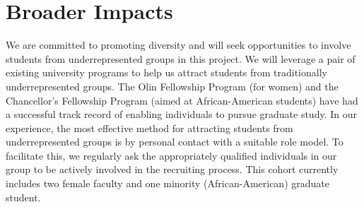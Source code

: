 \section{Broader Impacts}
\label{sec:broader}


We are committed to promoting diversity and will seek opportunities to
involve students from underrepresented groups in this project.
We will leverage a pair of existing university programs to help us
attract students from traditionally underrepresented groups.  The Olin
Fellowship Program (for women) and the Chancellor's Fellowship Program
(aimed at African-American students) have had a successful track
record of enabling individuals to pursue graduate study.  In our
experience, the most effective method for attracting students from
underrepresented groups is by personal contact with a suitable role
model.  To facilitate this, we regularly ask the appropriately
qualified individuals in our group to be actively involved in the
recruiting process.  This cohort currently includes two female
faculty and one minority (African-American)
graduate student.

